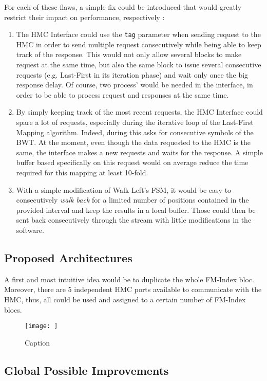 For each of these flaws, a simple fix could be introduced that would greatly restrict their impact on performance, respectively :

\begin{enumerate}
    \item The HMC Interface could use the \texttt{tag} parameter when sending request to the HMC in order to send multiple request consecutively while being able to keep track of the response. This would not only allow several blocks to make request at the same time, but also the same block to issue several consecutive requests (e.g. Last-First in its iteration phase) and wait only once the big response delay. Of course, two process' would be needed in the interface, in order to be able to process request and responses at the same time.
    \item By simply keeping track of the most recent requests, the HMC Interface could spare a lot of requests, especially during the iterative loop of the Last-First Mapping algorithm. Indeed, during this asks for consecutive symbols of the BWT. At the moment, even though the data requested to the HMC is the same, the interface makes a new requests and waits for the response. A simple buffer based specifically on this request would on average reduce the time required for this mapping at least 10-fold.
    \item With a simple modification of Walk-Left's FSM, it would be easy to consecutively \textit{walk back} for a limited number of positions contained in the provided interval and keep the results in a local buffer. Those could then be sent back consecutively through the stream with little modifications in the software.
\end{enumerate}

\subsection{Proposed Architectures}

A first and most intuitive idea would be to duplicate the whole FM-Index bloc. Moreover, there are 5 independent HMC ports available to communicate with the HMC, thus, all could be used and assigned to a certain number of FM-Index blocs. 

\begin{figure}[H]
    \centering
    \texttt{[image: ]}
    \caption{Caption}
    \label{fig:my_label}
\end{figure}

\subsection{Global Possible Improvements}


